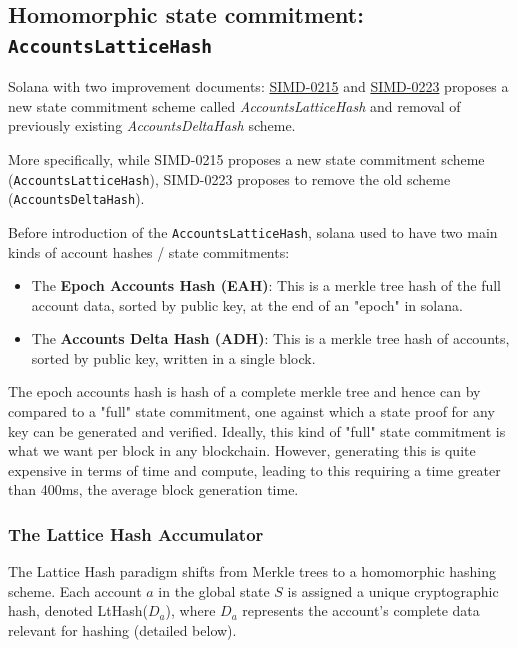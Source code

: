 \subsection{Homomorphic state commitment: \texttt{AccountsLatticeHash}}
Solana with two improvement documents: \href{https://github.com/solana-foundation/solana-improvement-documents/blob/main/proposals/0215-accounts-lattice-hash.md}{SIMD-0215} and \href{https://github.com/solana-foundation/solana-improvement-documents/blob/main/proposals/0223-removes-accounts-delta-hash.md}{SIMD-0223} proposes a new state commitment scheme called \textit{AccountsLatticeHash} and removal of previously existing \textit{AccountsDeltaHash} scheme.

More specifically, while SIMD-0215 proposes a new state commitment scheme (\texttt{AccountsLatticeHash}), SIMD-0223 proposes to remove the old scheme (\texttt{AccountsDeltaHash}).

Before introduction of the \texttt{AccountsLatticeHash}, solana used to have two main kinds of account hashes / state commitments:
\begin{itemize}
    \item The \textbf{Epoch Accounts Hash (EAH)}: This is a merkle tree hash of the full account data, sorted by public key, at the end of an "epoch" in solana.
    \item The \textbf{Accounts Delta Hash (ADH)}: This is a merkle tree hash of accounts, sorted by public key, written in a single block.
\end{itemize}

The epoch accounts hash is hash of a complete merkle tree and hence can by compared to a "full" state commitment, one against which a state proof for any key can be generated and verified. Ideally, this kind of "full" state commitment is what we want per block in any blockchain. However, generating this is quite expensive in terms of time and compute, leading to this requiring a time greater than 400ms, the average block generation time.

\subsubsection{The Lattice Hash Accumulator}
The Lattice Hash paradigm shifts from Merkle trees to a homomorphic hashing scheme. Each
account $a$ in the global state $S$ is assigned a unique cryptographic hash, denoted LtHash($D_a$),
where $D_a$ represents the account's complete data relevant for hashing (detailed below).

